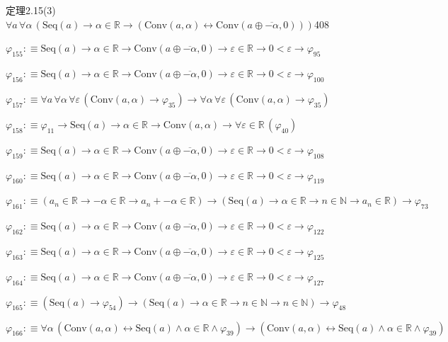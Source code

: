 \begin{fullproof}{定理2.15(3)}{$\forall a\,\forall \alpha\,(\mathrm{Seq}(a) \to \alpha \in \mathbb{R} \to (\mathrm{Conv}(a,\alpha) \leftrightarrow \mathrm{Conv}(a \oplus \overline{-\alpha},0)))$}{408}
\begin{abbrevlist}
\item $\varphi_{155} :\equiv \mathrm{Seq}(a) \to \alpha \in \mathbb{R} \to \mathrm{Conv}(a \oplus \overline{-\alpha},0) \to \varepsilon \in \mathbb{R} \to 0 < \varepsilon \to \varphi_{95}$
\item $\varphi_{156} :\equiv \mathrm{Seq}(a) \to \alpha \in \mathbb{R} \to \mathrm{Conv}(a \oplus \overline{-\alpha},0) \to \varepsilon \in \mathbb{R} \to 0 < \varepsilon \to \varphi_{100}$
\item $\varphi_{157} :\equiv \forall a\,\forall \alpha\,\forall \varepsilon\,(\mathrm{Conv}(a,\alpha) \to \varphi_{35}) \to \forall \alpha\,\forall \varepsilon\,(\mathrm{Conv}(a,\alpha) \to \varphi_{35})$
\item $\varphi_{158} :\equiv \varphi_{11} \to \mathrm{Seq}(a) \to \alpha \in \mathbb{R} \to \mathrm{Conv}(a,\alpha) \to \forall \varepsilon \in \mathbb{R}\,(\varphi_{40})$
\item $\varphi_{159} :\equiv \mathrm{Seq}(a) \to \alpha \in \mathbb{R} \to \mathrm{Conv}(a \oplus \overline{-\alpha},0) \to \varepsilon \in \mathbb{R} \to 0 < \varepsilon \to \varphi_{108}$
\item $\varphi_{160} :\equiv \mathrm{Seq}(a) \to \alpha \in \mathbb{R} \to \mathrm{Conv}(a \oplus \overline{-\alpha},0) \to \varepsilon \in \mathbb{R} \to 0 < \varepsilon \to \varphi_{119}$
\item $\varphi_{161} :\equiv (a_{n} \in \mathbb{R} \to -\alpha \in \mathbb{R} \to a_{n} + -\alpha \in \mathbb{R}) \to (\mathrm{Seq}(a) \to \alpha \in \mathbb{R} \to n \in \mathbb{N} \to a_{n} \in \mathbb{R}) \to \varphi_{73}$
\item $\varphi_{162} :\equiv \mathrm{Seq}(a) \to \alpha \in \mathbb{R} \to \mathrm{Conv}(a \oplus \overline{-\alpha},0) \to \varepsilon \in \mathbb{R} \to 0 < \varepsilon \to \varphi_{122}$
\item $\varphi_{163} :\equiv \mathrm{Seq}(a) \to \alpha \in \mathbb{R} \to \mathrm{Conv}(a \oplus \overline{-\alpha},0) \to \varepsilon \in \mathbb{R} \to 0 < \varepsilon \to \varphi_{125}$
\item $\varphi_{164} :\equiv \mathrm{Seq}(a) \to \alpha \in \mathbb{R} \to \mathrm{Conv}(a \oplus \overline{-\alpha},0) \to \varepsilon \in \mathbb{R} \to 0 < \varepsilon \to \varphi_{127}$
\item $\varphi_{165} :\equiv (\mathrm{Seq}(a) \to \varphi_{54}) \to (\mathrm{Seq}(a) \to \alpha \in \mathbb{R} \to n \in \mathbb{N} \to n \in \mathbb{N}) \to \varphi_{48}$
\item $\varphi_{166} :\equiv \forall \alpha\,(\mathrm{Conv}(a,\alpha) \leftrightarrow \mathrm{Seq}(a) \land \alpha \in \mathbb{R} \land \varphi_{39}) \to (\mathrm{Conv}(a,\alpha) \leftrightarrow \mathrm{Seq}(a) \land \alpha \in \mathbb{R} \land \varphi_{39})$

\end{abbrevlist}
\end{fullproof}
